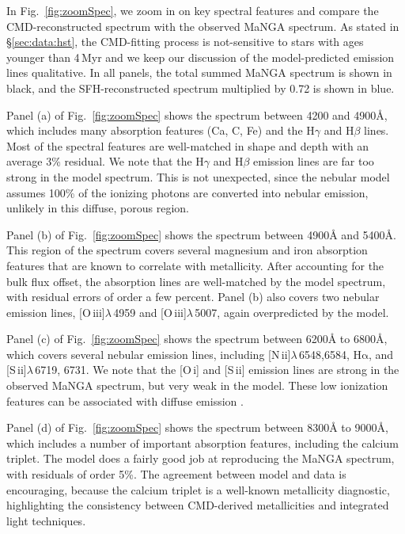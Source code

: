 \documentclass[preprint2]{aastex62}
\newcommand{\nii}{[N\,{\sc ii}]\xspace}
\newcommand{\sii}{[S\,{\sc ii}]\xspace}
\newcommand{\oiii}{[O\,{\sc iii}]\xspace}
\newcommand{\oi}{[O\,{\sc i}]\xspace}
\newcommand{\ha}{\ensuremath{\mathrm{H\alpha}}\xspace}
\newcommand{\ang}{\ensuremath{\mbox{\AA}}\xspace}
\newcommand{\Myr}{$\,$Myr\xspace}
\begin{document}
In Fig.~\ref{fig:zoomSpec}, we zoom in on key spectral features and compare the CMD-reconstructed spectrum with the observed MaNGA spectrum. As stated in \S\ref{sec:data:hst}, the CMD-fitting process is not-sensitive to stars with ages younger than 4\Myr and we keep our discussion of the model-predicted emission lines qualitative. In all panels, the total summed MaNGA spectrum is shown in black, and the SFH-reconstructed spectrum multiplied by 0.72 is shown in blue.

Panel (a) of Fig.~\ref{fig:zoomSpec} shows the spectrum between 4200 and 4900\ang, which includes many absorption features (Ca, C, Fe) and the H$\gamma$ and H$\beta$ lines. Most of the spectral features are well-matched in shape and depth with an average 3\% residual. We note that the H$\gamma$ and H$\beta$ emission lines are far too strong in the model spectrum. This is not unexpected, since the nebular model assumes 100\% of the ionizing photons are converted into nebular emission, unlikely in this diffuse, porous region.

Panel (b) of Fig.~\ref{fig:zoomSpec} shows the spectrum between 4900\ang and 5400\ang. This region of the spectrum covers several magnesium and iron absorption features that are known to correlate with metallicity. After accounting for the bulk flux offset, the absorption lines are well-matched by the model spectrum, with residual errors of order a few percent. Panel (b) also covers two nebular emission lines, \oiii$\lambda$\,4959 and \oiii$\lambda$\,5007, again overpredicted by the model.

Panel (c) of Fig.~\ref{fig:zoomSpec} shows the spectrum between 6200\ang to 6800\ang, which covers several nebular emission lines, including \nii$\lambda$\,6548,6584, \ha, and \sii$\lambda$\,6719, 6731. We note that the \oi and \sii emission lines are strong in the observed MaNGA spectrum, but very weak in the model. These low ionization features can be associated with diffuse emission \citep[e.g.,][]{Zhang+2017}.

Panel (d) of Fig.~\ref{fig:zoomSpec} shows the spectrum between 8300\ang to 9000\ang, which includes a number of important absorption features, including the calcium triplet. The model does a fairly good job at reproducing the MaNGA spectrum, with residuals of order 5\%. The agreement between model and data is encouraging, because the calcium triplet is a well-known metallicity diagnostic, highlighting the consistency between CMD-derived metallicities and integrated light techniques.
\end{document}
